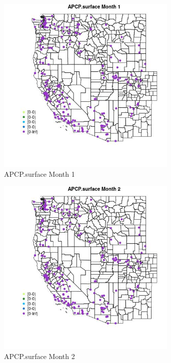 \begin{figure} 
\centering  
\includegraphics[width=0.77\textwidth]{Code_Outputs/Report_ML_input_PM25_Step4_part_e_de_duplicated_aveswNAs_MapObsMo1APCPsurface.jpg} 
\caption{\label{fig:Report_ML_input_PM25_Step4_part_e_de_duplicated_aveswNAsMapObsMo1APCPsurface}APCP.surface Month 1} 
\end{figure} 
 

\begin{figure} 
\centering  
\includegraphics[width=0.77\textwidth]{Code_Outputs/Report_ML_input_PM25_Step4_part_e_de_duplicated_aveswNAs_MapObsMo2APCPsurface.jpg} 
\caption{\label{fig:Report_ML_input_PM25_Step4_part_e_de_duplicated_aveswNAsMapObsMo2APCPsurface}APCP.surface Month 2} 
\end{figure} 
 

